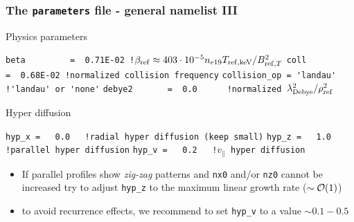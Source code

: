 \documentclass[10pt]{beamer}
\begin{document}
\begin{frame}[fragile]
  \frametitle{The {\tt parameters} file - general namelist III}

\begin{block}{Physics parameters}

\verb|beta         =  0.71E-02 !|$\beta_{\rm ref}\approx 403\cdot 10^{-5} n_{e19} T_{{\rm ref} ,\mathrm{keV}}/B_{{\rm ref} ,T}^2$
\verb|coll         =  0.68E-02 !normalized collision frequency|
\verb|collision_op = 'landau'  !'landau' or 'none'|
\verb|debye2       =  0.0      !normalized |$\lambda^2_{\rm Debye}/\rho_{\rm ref}^2$
\end{block}

\begin{block}{Hyper diffusion}

\begin{block}

\verb|hyp_x =   0.0   !radial hyper diffusion (keep small)|
\verb|hyp_z =   1.0   !parallel hyper diffusion|
\verb|hyp_v =   0.2   !|$v_\parallel$\verb| hyper diffusion|
\end{block}
\begin{itemize}
\item If parallel profiles %
show {\em zig-zag} patterns and {\tt nx0} and/or {\tt nz0} cannot be increased try to adjust {\tt hyp\_z} to the maximum linear growth rate ($\sim {\cal O}(1)$)
\item to avoid recurrence effects, we recommend to set {\tt hyp\_v} to a value $\sim 0.1-0.5$
\end{itemize}
\end{block}

\end{frame}

\end{document}
